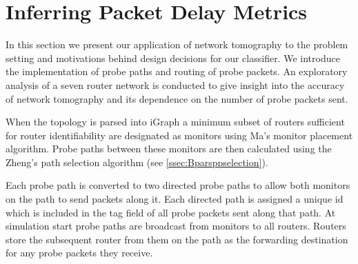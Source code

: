 \section{Inferring Packet Delay Metrics}
\label{sec:Mnetworkprobing}
In this section we present our application of network tomography to the problem setting and motivations behind design decisions for our classifier. We introduce the implementation of probe paths and routing of probe packets. An exploratory analysis of a seven router network is conducted to give insight into the accuracy of network tomography and its dependence on the number of probe packets sent.\par
When the topology is parsed into iGraph a minimum subset of routers sufficient for router identifiability are designated as monitors using Ma's monitor placement algorithm. Probe paths between these monitors are then calculated using the Zheng's path selection algorithm (see \cref{ssec:Bparsppselection}).\par
Each probe path is converted to two directed probe paths to allow both monitors on the path to send packets along it. Each directed path is assigned a unique id which is included in the tag field of all probe packets sent along that path. At simulation start probe paths are broadcast from monitors to all routers. Routers store the subsequent router from them on the path as the forwarding destination for any probe packets they receive.\par

